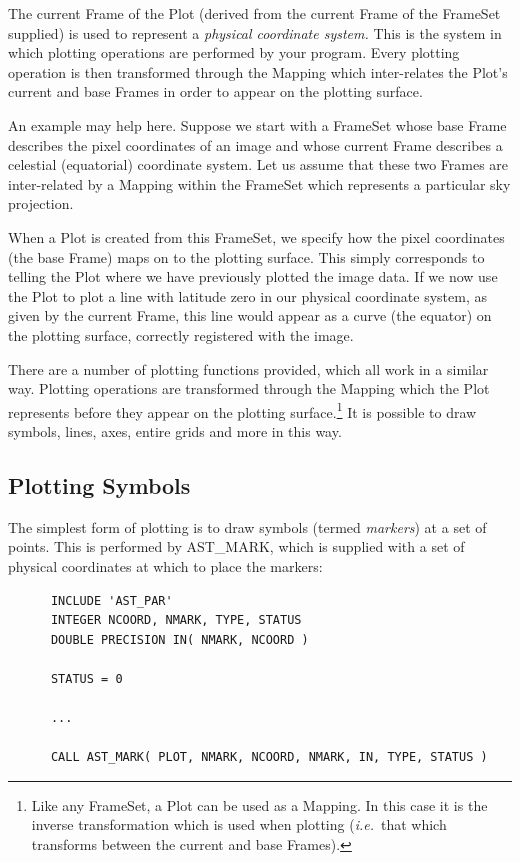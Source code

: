 \documentclass[twoside,11pt]{article}
\newcommand{\htmlref}[2]{#1}
\begin{document}
The current Frame of the Plot (derived from the current Frame of the
FrameSet supplied) is used to represent a {\em{physical coordinate
system.}} This is the system in which plotting operations are
performed by your program.  Every plotting operation is then
transformed through the \htmlref{Mapping}{Mapping} which inter-relates the Plot's current
and base Frames in order to appear on the plotting surface.

An example may help here. Suppose we start with a FrameSet whose base
Frame describes the pixel coordinates of an image and whose current
Frame describes a celestial (equatorial) coordinate system. Let us
assume that these two Frames are inter-related by a Mapping within the
FrameSet which represents a particular sky projection.

When a Plot is created from this FrameSet, we specify how the pixel
coordinates (the base Frame) maps on to the plotting surface. This
simply corresponds to telling the Plot where we have previously
plotted the image data. If we now use the Plot to plot a line with
latitude zero in our physical coordinate system, as given by the
current Frame, this line would appear as a curve (the equator) on the
plotting surface, correctly registered with the image.

There are a number of plotting functions provided, which all work in a
similar way. Plotting operations are transformed through the Mapping
which the Plot represents before they appear on the plotting
surface.\footnote{Like any FrameSet, a Plot can be used as a
Mapping. In this case it is the inverse transformation which is used
when plotting ({\em{i.e.}}\ that which transforms between the current
and base Frames).}  It is possible to draw symbols, lines, axes,
entire grids and more in this way.


\subsection{Plotting Symbols}

The simplest form of plotting is to draw symbols (termed
{\em{markers}}) at a set of points. This is performed by \htmlref{AST\_MARK}{AST_MARK},
which is supplied with a set of physical coordinates at which to place
the markers:

\small
\begin{verbatim}
      INCLUDE 'AST_PAR'
      INTEGER NCOORD, NMARK, TYPE, STATUS
      DOUBLE PRECISION IN( NMARK, NCOORD )

      STATUS = 0

      ...

      CALL AST_MARK( PLOT, NMARK, NCOORD, NMARK, IN, TYPE, STATUS )
\end{verbatim}
\normalsize
\end{document}
